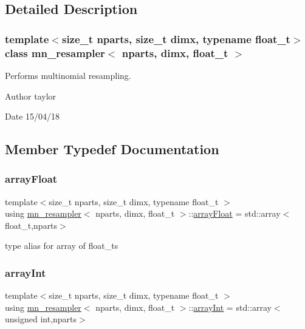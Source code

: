 \subsection{Detailed Description}
\subsubsection*{template$<$size\+\_\+t nparts, size\+\_\+t dimx, typename float\+\_\+t$>$\newline
class mn\+\_\+resampler$<$ nparts, dimx, float\+\_\+t $>$}

Performs multinomial resampling. 

\begin{DoxyAuthor}{Author}
taylor 
\end{DoxyAuthor}
\begin{DoxyDate}{Date}
15/04/18 
\end{DoxyDate}


\subsection{Member Typedef Documentation}
\mbox{\label{classmn__resampler_ae26be2889cf3cd4ddea66928d879809e}} 
\subsubsection{\texorpdfstring{array\+Float}{arrayFloat}}
{\footnotesize\ttfamily template$<$size\+\_\+t nparts, size\+\_\+t dimx, typename float\+\_\+t $>$ \\
using \hyperlink{classmn__resampler}{mn\+\_\+resampler}$<$ nparts, dimx, float\+\_\+t $>$\+::\hyperlink{classrbase_a6f76bef853e508cb5b6f546d231b06f5}{array\+Float} =  std\+::array$<$float\+\_\+t,nparts$>$}

type alias for array of float\+\_\+ts \mbox{\label{classmn__resampler_afb5d000e2464afef813792c57c42599b}} 
\subsubsection{\texorpdfstring{array\+Int}{arrayInt}}
{\footnotesize\ttfamily template$<$size\+\_\+t nparts, size\+\_\+t dimx, typename float\+\_\+t $>$ \\
using \hyperlink{classmn__resampler}{mn\+\_\+resampler}$<$ nparts, dimx, float\+\_\+t $>$\+::\hyperlink{classmn__resampler_afb5d000e2464afef813792c57c42599b}{array\+Int} =  std\+::array$<$unsigned int,nparts$>$}

